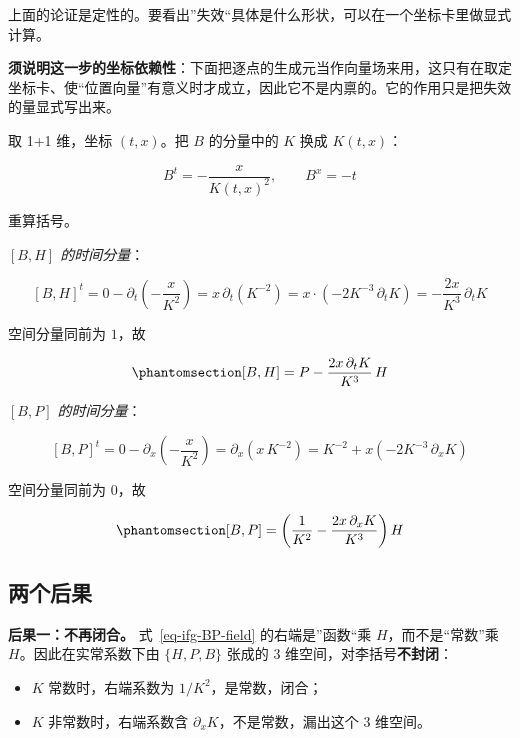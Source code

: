 \documentclass[
  chinese,
  a4paper,
  UTF8,
  12pt,
  oneside,
  openany]{ctexbook}
\providecommand{\tightlist}{%
  \setlength{\itemsep}{0pt}\setlength{\parskip}{0pt}}
\theoremstyle{plain}
\theoremstyle{plain}
\theoremstyle{plain}
\theoremstyle{definition}
\theoremstyle{plain}
\theoremstyle{plain}
\theoremstyle{remark}
\begin{document}
上面的论证是定性的。要看出''失效``具体是什么形状，可以在一个坐标卡里做显式计算。

\textbf{须说明这一步的坐标依赖性}：下面把逐点的生成元当作向量场来用，这只有在取定坐标卡、使``位置向量''有意义时才成立，因此它不是内禀的。它的作用只是把失效的量显式写出来。

取 1+1 维，坐标 \((t,x)\)。把 \(B\) 的分量中的 \(K\) 换成 \(K(t,x)\)：

\[
B^{t}=-\frac{x}{K(t,x)^{2}},\qquad B^{x}=-t
\]

重算括号。

\emph{\([B,H]\) 的时间分量}：

\[
[B,H]^{t}=0-\partial_t\!\left(-\frac{x}{K^{2}}\right)
=x\,\partial_t\!\left(K^{-2}\right)
=x\cdot\left(-2K^{-3}\,\partial_tK\right)
=-\frac{2x}{K^{3}}\,\partial_tK
\]

空间分量同前为 \(1\)，故

\begin{equation}\protect\phantomsection\label{eq-ifg-BH-field}{
[B,H]=P-\frac{2x\,\partial_tK}{K^{3}}\,H
}\end{equation}

\emph{\([B,P]\) 的时间分量}：

\[
[B,P]^{t}=0-\partial_x\!\left(-\frac{x}{K^{2}}\right)
=\partial_x\!\left(x\,K^{-2}\right)
=K^{-2}+x\left(-2K^{-3}\,\partial_xK\right)
\]

空间分量同前为 \(0\)，故

\begin{equation}\protect\phantomsection\label{eq-ifg-BP-field}{
[B,P]=\left(\frac{1}{K^{2}}-\frac{2x\,\partial_xK}{K^{3}}\right)H
}\end{equation}

\subsection{两个后果}\label{ux4e24ux4e2aux540eux679c}

\textbf{后果一：不再闭合。} 式~\ref{eq-ifg-BP-field} 的右端是''函数``乘
\(H\)，而不是``常数''乘 \(H\)。因此在实常系数下由 \(\{H,P,B\}\) 张成的
\(3\) 维空间，对李括号\textbf{不封闭}：

\begin{itemize}
\tightlist
\item
  \(K\) 常数时，右端系数为 \(1/K^{2}\)，是常数，闭合；
\item
  \(K\) 非常数时，右端系数含 \(\partial_xK\)，不是常数，漏出这个 \(3\)
  维空间。
\end{itemize}
\end{document}
